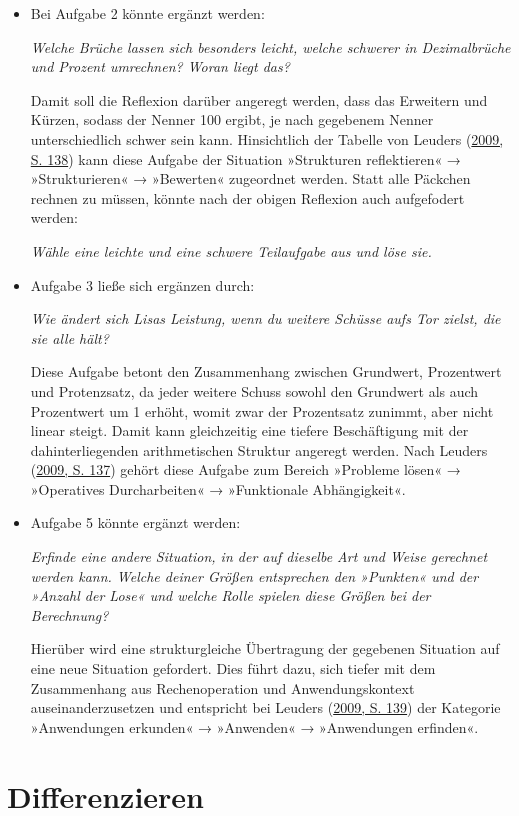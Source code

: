 \documentclass[
]{scrbook}
\theoremstyle{definition}
\theoremstyle{definition}
\theoremstyle{definition}
\theoremstyle{definition}
\theoremstyle{remark}
\begin{document}
\begin{itemize}
\item
  Bei Aufgabe 2 könnte ergänzt werden:

  \emph{Welche Brüche lassen sich besonders leicht, welche schwerer in Dezimalbrüche und Prozent umrechnen? Woran liegt das?}

  Damit soll die Reflexion darüber angeregt werden, dass das Erweitern und Kürzen, sodass der Nenner 100 ergibt, je nach gegebenem Nenner unterschiedlich schwer sein kann. Hinsichtlich der Tabelle von Leuders (\protect\hyperlink{ref-Leuders2009}{2009, S. 138}) kann diese Aufgabe der Situation »Strukturen reflektieren« → »Strukturieren« → »Bewerten« zugeordnet werden. Statt alle Päckchen rechnen zu müssen, könnte nach der obigen Reflexion auch aufgefodert werden:

  \emph{Wähle eine leichte und eine schwere Teilaufgabe aus und löse sie.}
\item
  Aufgabe 3 ließe sich ergänzen durch:

  \emph{Wie ändert sich Lisas Leistung, wenn du weitere Schüsse aufs Tor zielst, die sie alle hält?}

  Diese Aufgabe betont den Zusammenhang zwischen Grundwert, Prozentwert und Protenzsatz, da jeder weitere Schuss sowohl den Grundwert als auch Prozentwert um 1 erhöht, womit zwar der Prozentsatz zunimmt, aber nicht linear steigt. Damit kann gleichzeitig eine tiefere Beschäftigung mit der dahinterliegenden arithmetischen Struktur angeregt werden. Nach Leuders (\protect\hyperlink{ref-Leuders2009}{2009, S. 137}) gehört diese Aufgabe zum Bereich »Probleme lösen« → »Operatives Durcharbeiten« → »Funktionale Abhängigkeit«.
\item
  Aufgabe 5 könnte ergänzt werden:

  \emph{Erfinde eine andere Situation, in der auf dieselbe Art und Weise gerechnet werden kann. Welche deiner Größen entsprechen den »Punkten« und der »Anzahl der Lose« und welche Rolle spielen diese Größen bei der Berechnung?}

  Hierüber wird eine strukturgleiche Übertragung der gegebenen Situation auf eine neue Situation gefordert. Dies führt dazu, sich tiefer mit dem Zusammenhang aus Rechenoperation und Anwendungskontext auseinanderzusetzen und entspricht bei Leuders (\protect\hyperlink{ref-Leuders2009}{2009, S. 139}) der Kategorie »Anwendungen erkunden« → »Anwenden« → »Anwendungen erfinden«.
\end{itemize}

\hypertarget{differenzieren}{%
\section{Differenzieren}\label{differenzieren}}
\end{document}
